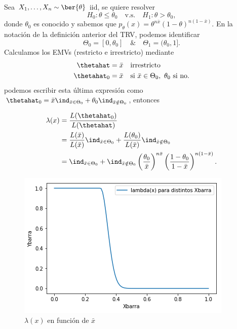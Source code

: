 \begin{example}
	Sea $X_1,\ldots,X_n\sim\ber{\theta}$ iid, se quiere resolver
	\begin{equation}
		H_0:\theta \leq\theta_0\quad \text{v.s.}\quad H_1:\theta >\theta_0,
	\end{equation}
donde $\theta_0$ es conocido y sabemos que $p_\theta(x) = \theta^{n\bar{x}}(1-\theta)^{n(1-\bar{x})}$. En la notación de la definición anterior del TRV, podemos identificar
\begin{equation}
	\Theta_0 = [0,\theta_0] \quad \& \quad \Theta_1 = (\theta_0, 1].
\end{equation}
Calculamos los EMVs (restricto e irrestricto) mediante 
\begin{align}
	\thetahat &= \bar{x}\quad \text{irrestricto}\\
	\thetahat_0 &= \bar{x} \quad \text{si } \bar{x}\in\Theta_0,\ \theta_0 \text{ si no.}
\end{align}
podemos escribir esta última expresión como $\thetahat_0 = \bar{x} \ind_{\bar{x}\in\Theta_0} + \theta_0\ind_{\bar{x}\notin\Theta_0}$, entonces

\begin{align}
	\lambda(x) &= \frac{L(\thetahat_0)}{L(\thetahat)}\\ 
				&= \frac{L(\bar{x})}{L(\bar{x})} \ind_{\bar{x}\in\Theta_0} + \frac{L(\theta_0)}{L(\bar{x})} \ind_{\bar{x}\notin\Theta_0} \\
				&= \ind_{\bar{x}\in\Theta_0} + \ind_{\bar{x}\notin\Theta_0} \left(\frac{\theta_0}{\bar{x}}\right)^{n\bar{x}}\left(\frac{1-\theta_0}{1-\bar{x}}\right)^{n(1-\bar{x})}.
\end{align}
\begin{figure}[ht]
    \centering
    \includegraphics[scale=0.7]{img/LKratio.png}
    \caption{$\lambda(x)$ en función de $\bar{x}$}
    \label{fig:lk_ratio}
\end{figure}


\end{example}
